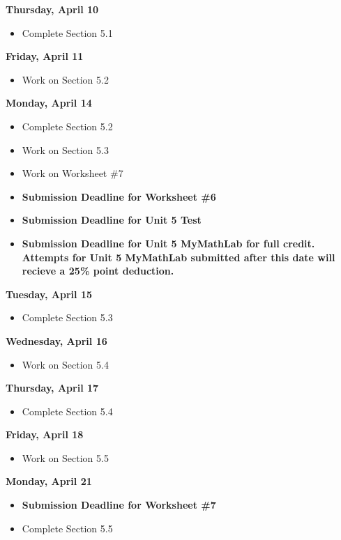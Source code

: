 \documentclass[11pt]{article}
\begin{document}
\textbf{Thursday, April 10}

\begin{itemize}
\item Complete Section 5.1
\end{itemize}

\textbf{Friday, April 11}

\begin{itemize}
\item Work on Section 5.2
\end{itemize}

\textbf{Monday, April 14}

\begin{itemize}
\item Complete Section 5.2
\item Work on Section 5.3
\item Work on Worksheet \#7
\item \textbf{Submission Deadline for Worksheet \#6}
\item \textbf{Submission Deadline for Unit 5 Test}
\item \textbf{Submission Deadline for Unit 5 MyMathLab for full credit. Attempts for Unit 5 MyMathLab submitted after this date will recieve a 25\% point deduction.}
\end{itemize}

\textbf{Tuesday, April 15}

\begin{itemize}
\item Complete Section 5.3
\end{itemize}

\textbf{Wednesday, April 16}

\begin{itemize}
\item Work on Section 5.4
\end{itemize}

\textbf{Thursday, April 17}

\begin{itemize}
\item Complete Section 5.4
\end{itemize}

\textbf{Friday, April 18}

\begin{itemize}
\item Work on Section 5.5
\end{itemize}

\textbf{Monday, April 21}

\begin{itemize}
\item \textbf{Submission Deadline for Worksheet \#7}
\item Complete Section 5.5
\end{itemize}
\end{document}
